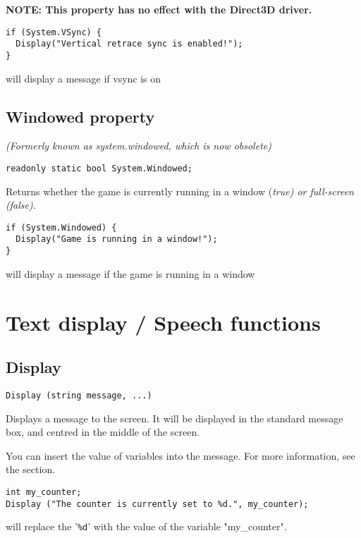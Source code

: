\bf{NOTE:} This property has no effect with the Direct3D driver.

\begin{verbatim}
if (System.VSync) {
  Display("Vertical retrace sync is enabled!");
}
\end{verbatim}
will display a message if vsync is on


\subsection{Windowed property}\label{System.Windowed}%

\it{(Formerly known as system.windowed, which is now obsolete)}

\begin{verbatim}
readonly static bool System.Windowed;
\end{verbatim}
Returns whether the game is currently running in a window (\it{true}) or
full-screen (\it{false}).

\begin{verbatim}
if (System.Windowed) {
  Display("Game is running in a window!");
}
\end{verbatim}
will display a message if the game is running in a window




\section{Text display / Speech functions}%

\subsection{Display}\label{Display}%

\begin{verbatim}
Display (string message, ...)
\end{verbatim}
Displays a message to the screen. It will be displayed in the standard
message box, and centred in the middle of the screen.

You can insert the value of variables into the message. For more information,
see the  section.

\begin{verbatim}
int my_counter;
Display ("The counter is currently set to %d.", my_counter);
\end{verbatim}
will replace the '\verb$%d$' with the value of the variable "my_counter".

